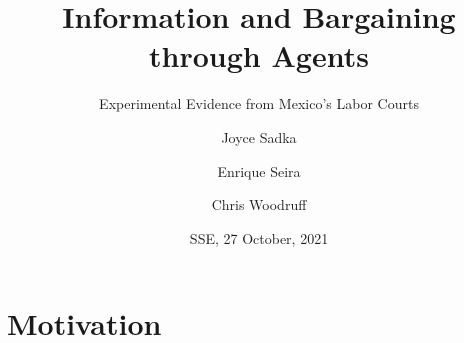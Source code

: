 \documentclass[9pt]{beamer}
\title{Information and Bargaining through Agents}
\subtitle{Experimental Evidence from Mexico's Labor Courts}
\author{Joyce Sadka\inst{1} \and Enrique Seira\inst{2} \and Chris Woodruff\inst{3}}
\institute[ITAM, Oxford] %
{
  \inst{1,2}%
  Instituto Tecnologico Autonomo de Mexico
  \and
  \inst{3}%
  Oxford University
}
\date{SSE, 27 October, 2021}
\begin{document}
\begin{frame}
  \titlepage
\end{frame}


%    
%      

\section{Motivation}
\end{document}
